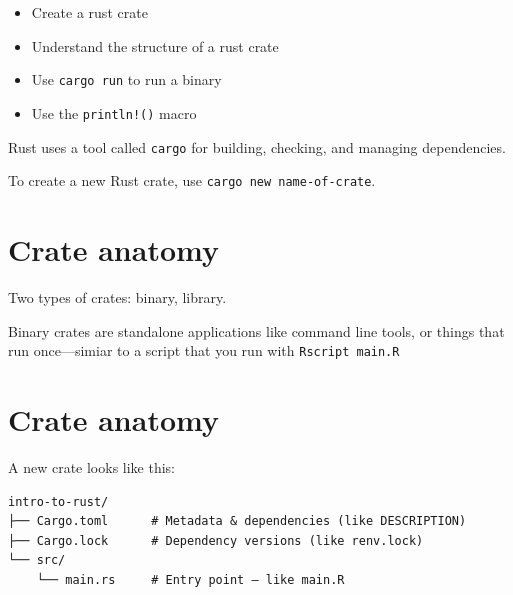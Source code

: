 \documentclass[
  letterpaper,
  DIV=11,
  numbers=noendperiod,
  oneside]{scrreprt}
\providecommand{\tightlist}{%
  \setlength{\itemsep}{0pt}\setlength{\parskip}{0pt}}\usepackage{longtable,booktabs,array}
\begin{document}
\begin{tcolorbox}[enhanced jigsaw, titlerule=0mm, coltitle=black, opacitybacktitle=0.6, bottomrule=.15mm, bottomtitle=1mm, colframe=quarto-callout-tip-color-frame, toprule=.15mm, opacityback=0, rightrule=.15mm, leftrule=.75mm, breakable, left=2mm, colback=white, colbacktitle=quarto-callout-tip-color!10!white, toptitle=1mm, title=\textcolor{quarto-callout-tip-color}{\faLightbulb}\hspace{0.5em}{Objective}, arc=.35mm]

\begin{itemize}
\tightlist
\item
  Create a rust crate
\item
  Understand the structure of a rust crate
\item
  Use \texttt{cargo\ run} to run a binary
\item
  Use the \texttt{println!()} macro
\end{itemize}

\end{tcolorbox}

Rust uses a tool called \texttt{cargo} for building, checking, and
managing dependencies.

To create a new Rust crate, use \texttt{cargo\ new\ name-of-crate}.

\section{Crate anatomy}\label{crate-anatomy}

Two types of crates: binary, library.


Binary crates are standalone applications like command line tools, or
things that run once---simiar to a script that you run with
\texttt{Rscript\ main.R}

\section{Crate anatomy}\label{crate-anatomy-1}

A new crate looks like this:

\begin{verbatim}
intro-to-rust/
├── Cargo.toml      # Metadata & dependencies (like DESCRIPTION)
├── Cargo.lock      # Dependency versions (like renv.lock)
└── src/
    └── main.rs     # Entry point — like main.R
\end{verbatim}
\end{document}
